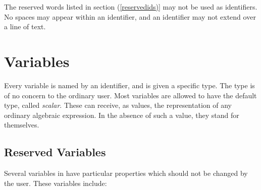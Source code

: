 The reserved words listed in section (\ref{reservedids)} may not be used as
identifiers.  No spaces may appear within an identifier, and an identifier
may not extend over a line of text.


\section{Variables}

Every variable is named by an identifier, and is given a
specific type.  The type is of no concern to the ordinary user.  Most
variables are allowed to have the default type, called 
\emph{scalar}.
These can receive, as values, the representation of any ordinary algebraic
expression.  In the absence of such a value, they stand for themselves.

\subsection*{Reserved Variables}
\hypertarget{reserved:E}{}
\hypertarget{reserved:I}{}
\hypertarget{reserved:INFINITY}{}
\hypertarget{reserved:NIL}{}
\hypertarget{reserved:PI}{}
\hypertarget{reserved:T}{}
\hypertarget{reserved:K!*}{}
\hypertarget{reserved:EULER_GAMMA}{}
\hypertarget{reserved:GOLDEN_RATIO}{}
\hypertarget{reserved:CATALAN}{}
\hypertarget{reserved:KHINCHIN}{}
\hypertarget{reserved:NEGATIVE}{}
\hypertarget{reserved:POSITIVE}{}

Several variables in {\REDUCE} have particular
properties which should not be changed by the user.  These variables
include:


